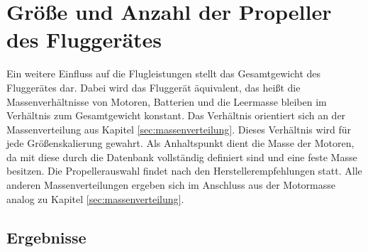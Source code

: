 
\section{Größe und Anzahl der Propeller des Fluggerätes}
\label{sec:groesse}
Ein weitere Einfluss auf die Flugleistungen stellt das Gesamtgewicht des Fluggerätes dar. Dabei wird das Fluggerät äquivalent, das heißt die Massenverhältnisse von Motoren, Batterien und die Leermasse bleiben im Verhältnis zum Gesamtgewicht konstant. Das Verhältnis orientiert sich an der Massenverteilung aus Kapitel \ref{sec:massenverteilung}. Dieses Verhältnis wird für jede Größenskalierung gewahrt. Als Anhaltspunkt dient die Masse der Motoren, da mit diese durch die Datenbank vollständig definiert sind und eine feste Masse besitzen. Die Propellerauswahl findet nach den Herstellerempfehlungen statt. Alle anderen Massenverteilungen ergeben sich im Anschluss aus der Motormasse analog zu Kapitel \ref{sec:massenverteilung}.

\subsection{Ergebnisse}
\label{subsec:ergebnisse_groesse}

